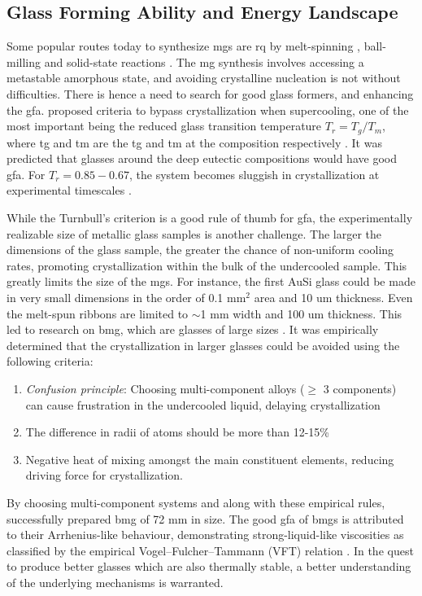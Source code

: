 \subsection{Glass Forming Ability and Energy Landscape} \label{s:gfa}
Some popular routes today to synthesize \gls{mg}s are \gls{rq} by melt-spinning \cite{Greer1995}, ball-milling \cite{Suryanarayana2001,Weeber1988} and solid-state reactions \cite{Schwarz1983}. 
The \gls{mg} synthesis involves accessing a metastable amorphous state, and avoiding crystalline nucleation is not without difficulties. There is hence a need to search for good glass formers, and enhancing the \gls{gfa}. \textcite{Turnbull1969} proposed criteria to bypass crystallization when supercooling, one of the most important being the reduced glass transition temperature $T_r = T_g/T_m$, where \gls{tg} and \gls{tm} are the \glsdesc{tg} and \glsdesc{tm} at the composition respectively \cite{Turnbull1969,Wang2004a}. It was predicted that glasses around the deep eutectic compositions would have good \gls{gfa}. For $T_r=0.85-0.67$, the system becomes sluggish in crystallization at experimental timescales \cite{Turnbull1969}. \par 

While the Turnbull's criterion is a good rule of thumb for \gls{gfa}, the experimentally realizable size of metallic glass samples is another challenge. The larger the dimensions of the glass sample, the greater the chance of non-uniform cooling rates, promoting crystallization within the bulk of the undercooled sample. This greatly limits the size of the \gls{mg}s. For instance, the first AuSi glass could be made in very small dimensions in the order of 0.1 mm$^2$ area and 10 \gls{um} thickness. Even the melt-spun ribbons are limited to $\sim$1 mm width and 100 \gls{um} thickness. This led to research on \gls{bmg}, which are glasses of large sizes \cite{Johnson1999,Greer2007}. It was empirically determined that the crystallization in larger glasses could be avoided using the following criteria:
\begin{enumerate}[noitemsep]
	\item \textit{Confusion principle}: Choosing multi-component alloys ($\ge$ 3 components) can cause frustration in the undercooled liquid, delaying crystallization
	\item The difference in radii of atoms should be more than 12-15\%
	\item Negative heat of mixing amongst the main constituent elements, reducing driving force for crystallization.
\end{enumerate}
By choosing multi-component systems and along with these empirical rules, \textcite{Inoue2000} successfully prepared \gls{bmg} of 72 mm in size. The good \gls{gfa} of \gls{bmg}s is attributed to their Arrhenius-like behaviour, demonstrating strong-liquid-like viscosities as classified by the empirical Vogel–Fulcher–Tammann (VFT) relation \cite{Debenedetti2001,Wang2004a}. In the quest to produce better glasses which are also thermally stable, a better understanding of the underlying mechanisms is warranted. \par

